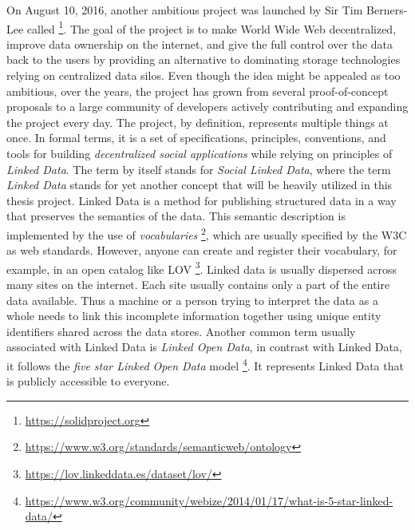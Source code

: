On August 10, 2016, another ambitious project was launched by Sir Tim Berners-Lee called \solid{} \footnote{\url{https://solidproject.org}}. The goal of the project is to make World Wide Web decentralized, improve data ownership on the internet, and give the full control over the data back to the users by providing an alternative to dominating storage technologies relying on centralized data silos. Even though the idea might be appealed as too ambitious, over the years, the project has grown from several proof-of-concept proposals to a large community of developers actively contributing and expanding the project every day. The \solid{} project, by definition, represents multiple things at once. In formal terms, it is a set of specifications, principles, conventions, and tools for building \textit{decentralized social applications} while relying on principles of \textit{Linked Data}. The term \solid{} by itself stands for \textit{Social Linked Data}, where the term \textit{Linked Data} stands for yet another concept that will be heavily utilized in this thesis project. Linked Data is a method for publishing structured data in a way that preserves the semantics of the data. This semantic description is implemented by the use of \textit{vocabularies} \footnote{\url{https://www.w3.org/standards/semanticweb/ontology}}, which are usually specified by the \acrshort{W3C} as web standards. However, anyone can create and register their vocabulary, for example, in an open catalog like \acrshort{LOV} \footnote{\url{https://lov.linkeddata.es/dataset/lov/}}. Linked data is usually dispersed across many sites on the internet. Each site usually contains only a part of the entire data available. Thus a machine or a person trying to interpret the data as a whole needs to link this incomplete information together using unique entity identifiers shared across the data stores. Another common term usually associated with Linked Data is \textit{Linked Open Data}, in contrast with Linked Data, it follows the \textit{five star Linked Open Data} model \footnote{\url{https://www.w3.org/community/webize/2014/01/17/what-is-5-star-linked-data/}}. It represents Linked Data that is publicly accessible to everyone.

